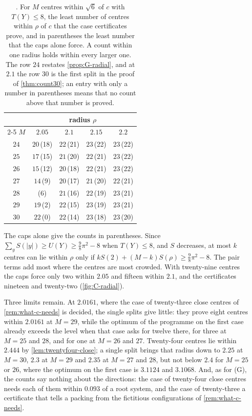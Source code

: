 \documentclass[11pt,reqno]{amsart}
\renewcommand{\_}{\origunderscore\allowbreak}
\numberwithin{equation}{section}
\theoremstyle{plain}
\theoremstyle{definition}
\theoremstyle{remark}
\begin{document}
\begin{table}[tb]
\centering
\caption{. For $M$ centres within $\sqrt6$ of $c$ with
$T(Y)\le8$, the least number of centres within $\rho$ of $c$ that the case
certificates prove, and in parentheses the least number that the caps alone
force. A count within one radius holds within every larger one. The row
$24$ restates \cref{prop:G-radial}, and at $2.1$ the row $30$ is the first
split in the proof of \cref{thm:count30}; an entry with only a number in
parentheses means that no count above that number is proved.}
\label{tab:C-radial}
\begin{tabular}{@{}c@{\qquad}cccc@{}}
\toprule
& \multicolumn{4}{c}{radius $\rho$}\\
\cmidrule(l){2-5}
$M$ & $2.05$ & $2.1$ & $2.15$ & $2.2$\\
\midrule
$24$ & $20$\,(18) & $22$\,(21) & $23$\,(22) & $23$\,(22)\\
$25$ & $17$\,(15) & $21$\,(20) & $22$\,(21) & $23$\,(22)\\
$26$ & $15$\,(12) & $20$\,(18) & $22$\,(21) & $23$\,(22)\\
$27$ & $14$\,(9) & $20$\,(17) & $21$\,(20) & $22$\,(21)\\
$28$ & (6) & $21$\,(16) & $22$\,(19) & $23$\,(21)\\
$29$ & $19$\,(2) & $22$\,(15) & $23$\,(19) & $23$\,(21)\\
$30$ & $22$\,(0) & $22$\,(14) & $23$\,(18) & $23$\,(20)\\
\bottomrule
\end{tabular}
\end{table}

The caps alone give the counts in parentheses. Since
$\sum_yS(|y|)\ge U(Y)\ge\frac98\pi^2-8$ when $T(Y)\le8$, and $S$ decreases,
at most $k$ centres can lie within $\rho$ only if
$kS(2)+(M-k)S(\rho)\ge\frac98\pi^2-8$. The pair terms add most where the
centres are most crowded. With twenty-nine centres the caps force only two
within $2.05$ and fifteen within $2.1$, and the certificates nineteen and
twenty-two (\cref{fig:C-radial}).

Three limits remain. At $2.0161$, where the case of twenty-three close
centres of \cref{rem:what-c-needs} is decided, the single splits give
little: they prove eight centres within $2.0161$ at $M=29$, while the
optimum of the programme on the first case already exceeds the level when
that case asks for twelve there, for three at $M=25$ and $28$, and for one at
$M=26$ and $27$. Twenty-four centres lie within
$2.444$ by \cref{lem:twentyfour-close}; a single split brings that radius
down to $2.25$ at $M=30$, $2.3$ at $M=29$ and $2.35$ at $M=27$ and $28$,
but not below $2.4$ for $M=25$ or $26$, where the optimum on the first case
is $3.1124$ and $3.1068$. And, as for (G), the counts say
nothing about the directions: the case of twenty-four close centres needs
each of them within $0.093$ of a root system, and the case of twenty-three
a certificate that tells a packing from the fictitious configurations of
\cref{rem:what-c-needs}.
\end{document}
